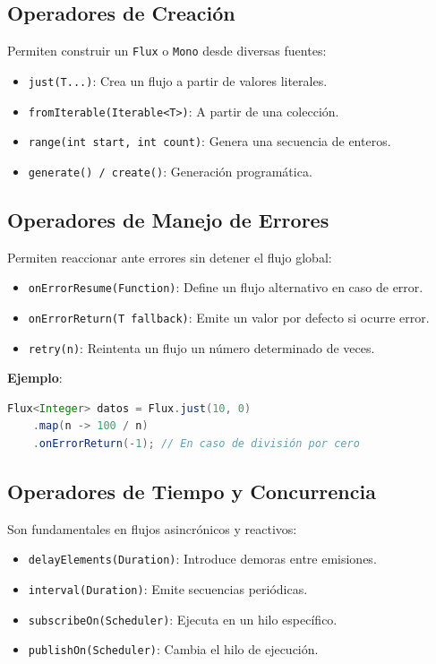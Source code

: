 \subsection{Operadores de Creación}

Permiten construir un \texttt{Flux} o \texttt{Mono} desde diversas fuentes:

\begin{itemize}
    \item \texttt{just(T...)}: Crea un flujo a partir de valores literales.
    \item \texttt{fromIterable(Iterable<T>)}: A partir de una colección.
    \item \texttt{range(int start, int count)}: Genera una secuencia de enteros.
    \item \texttt{generate() / create()}: Generación programática.
\end{itemize}

\subsection{Operadores de Manejo de Errores}

Permiten reaccionar ante errores sin detener el flujo global:

\begin{itemize}
    \item \texttt{onErrorResume(Function)}: Define un flujo alternativo en caso de error.
    \item \texttt{onErrorReturn(T fallback)}: Emite un valor por defecto si ocurre error.
    \item \texttt{retry(n)}: Reintenta un flujo un número determinado de veces.
\end{itemize}

\textbf{Ejemplo}:

\begin{lstlisting}[language=Java]
Flux<Integer> datos = Flux.just(10, 0)
    .map(n -> 100 / n)
    .onErrorReturn(-1); // En caso de división por cero
\end{lstlisting}

\subsection{Operadores de Tiempo y Concurrencia}

Son fundamentales en flujos asincrónicos y reactivos:

\begin{itemize}
    \item \texttt{delayElements(Duration)}: Introduce demoras entre emisiones.
    \item \texttt{interval(Duration)}: Emite secuencias periódicas.
    \item \texttt{subscribeOn(Scheduler)}: Ejecuta en un hilo específico.
    \item \texttt{publishOn(Scheduler)}: Cambia el hilo de ejecución.
\end{itemize}


